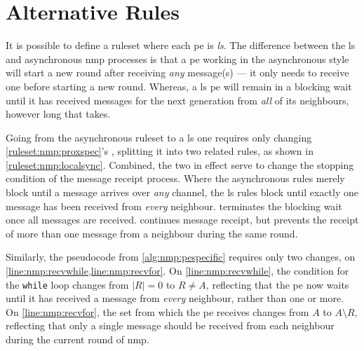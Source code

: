 \section{\label{sec:nmp:localsync}Alternative  Rules}
It is possible to define a \gls{ruleset} where each \gls{pe} is \emph{\gls{ls}}.  The difference between the \gls{ls} and asynchronous \gls{nmp} processes is that a \gls{pe} working in the asynchronous style will start a new round after receiving \emph{any} message(s) --- it only needs to receive one before starting a new round.  Whereas, a \gls{ls} \gls{pe} will remain in a blocking wait until it has received messages for the next generation from \emph{all} of its neighbours, however long that takes.

Going from the asynchronous \gls{ruleset} to a \gls{ls} one requires only changing \cref{ruleset:nmp:proxspec}'s , splitting it into two related rules, as shown in \cref{ruleset:nmp:localsync}.  Combined, the two in effect serve to change the stopping condition of the message receipt process.  Where the asynchronous rules merely block until a message arrives over \emph{any} channel, the \gls{ls} rules block until exactly one message has been received from \emph{every} neighbour.   terminates the blocking wait once all messages are received.   continues message receipt, but prevents the receipt of more than one message from a neighbour during the same round.

Similarly, the pseudocode from \cref{alg:nmp:pespecific} requires only two changes, on \cref{line:nmp:recvwhile,line:nmp:recvfor}.  On \cref{line:nmp:recvwhile}, the condition for the \texttt{while} loop changes from \(|R| = 0\) to \(R \not= A\), reflecting that the \gls{pe} now waits until it has received a message from \emph{every} neighbour, rather than one or more.  On \cref{line:nmp:recvfor}, the set from which the \gls{pe} receives changes from \(A\) to \(A \setminus R\), reflecting that only a single message should be received from each neighbour during the current round of \gls{nmp}.

